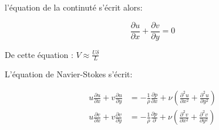 \documentclass[french]{article}
\begin{document}
l'équation de la continuté s'écrit alors:

\begin{equation}
\label{Eq:1}
\frac{\partial u}{\partial x} + \frac{\partial v}{\partial y} = 0
\end{equation}

De cette équation : $V \approx \frac{U\delta}{L} $



L'équation de Navier-Stokes s'écrit:

\begin{align}[Navier, Stokes]
u\frac{\partial u}{\partial x} + v\frac{\partial u}{\partial y} &= - \frac{1}{\rho}\frac{\partial p}{\partial  x} + \nu\left(\frac{\partial^{2} u}{\partial  x^{2}} + \frac{\partial^{2} u}{\partial  y^{2}}\right) \\

u\frac{\partial v}{\partial x} + v\frac{\partial v}{\partial y} &= - \frac{1}{\rho}\frac{\partial p}{\partial } + \nu\left(\frac{\partial^{2} v}{\partial  x^{2}} + \frac{\partial^{2} v}{\partial  y^{2}}\right)
\end{align}


\end{document}
